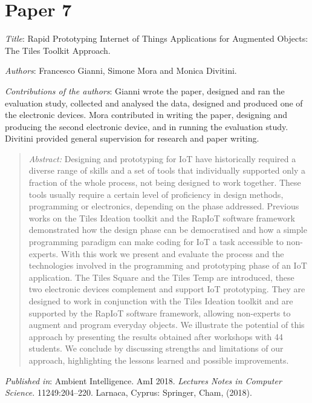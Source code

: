 \section[P7: Rapid Prototyping Internet of Things Applications for Augmented Objects: The Tiles Toolkit Approach.][Paper 7]{Paper 7}
\label{paper-7}

\emph{Title}: Rapid Prototyping Internet of Things Applications for Augmented Objects: The Tiles Toolkit Approach.

\emph{Authors}: Francesco Gianni, Simone Mora and Monica Divitini.

\emph{Contributions of the authors}: Gianni wrote the paper, designed and ran the evaluation study, collected and analysed the data, designed and produced one of the electronic devices. Mora contributed in writing the paper, designing and producing the second electronic device, and in running the evaluation study. Divitini provided general supervision for research and paper writing.

\begin{quote}
	\emph{Abstract:} Designing and prototyping for IoT have historically required a diverse range of skills and a set of tools that individually supported only a fraction of the whole process, not being designed to work together. These tools usually require a certain level of proficiency in design methods, programming or electronics, depending on the phase addressed. Previous works on the Tiles Ideation toolkit and the RapIoT software framework demonstrated how the design phase can be democratised and how a simple programming paradigm can make coding for IoT a task accessible to non-experts. With this work we present and evaluate the process and the technologies involved in the programming and prototyping phase of an IoT application. The Tiles Square and the Tiles Temp are introduced, these two electronic devices complement and support IoT prototyping. They are designed to work in conjunction with the Tiles Ideation toolkit and are supported by the RapIoT software framework, allowing non-experts to augment and program everyday objects. We illustrate the potential of this approach by presenting the results obtained after workshops with 44 students. We conclude by discussing strengths and limitations of our approach, highlighting the lessons learned and possible improvements.
\end{quote}

\emph{Published in}: Ambient Intelligence. AmI 2018. \emph{Lectures Notes in Computer Science.} 11249:204--220. Larnaca, Cyprus: Springer, Cham, (2018).

